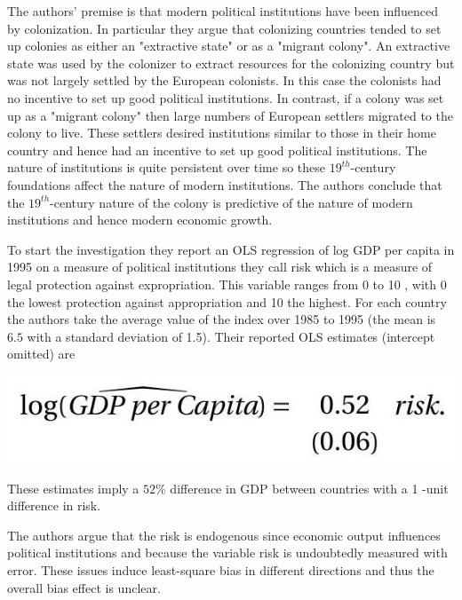 \documentclass[10pt]{article}
\begin{document}
The authors' premise is that modern political institutions have been influenced by colonization. In particular they argue that colonizing countries tended to set up colonies as either an "extractive state" or as a "migrant colony". An extractive state was used by the colonizer to extract resources for the colonizing country but was not largely settled by the European colonists. In this case the colonists had no incentive to set up good political institutions. In contrast, if a colony was set up as a "migrant colony" then large numbers of European settlers migrated to the colony to live. These settlers desired institutions similar to those in their home country and hence had an incentive to set up good political institutions. The nature of institutions is quite persistent over time so these $19^{t h}$-century foundations affect the nature of modern institutions. The authors conclude that the $19^{t h}$-century nature of the colony is predictive of the nature of modern institutions and hence modern economic growth.

To start the investigation they report an OLS regression of log GDP per capita in 1995 on a measure of political institutions they call risk which is a measure of legal protection against expropriation. This variable ranges from 0 to 10 , with 0 the lowest protection against appropriation and 10 the highest. For each country the authors take the average value of the index over 1985 to 1995 (the mean is $6.5$ with a standard deviation of 1.5). Their reported OLS estimates (intercept omitted) are

\includegraphics[max width=\textwidth]{2022_09_17_f9391324ededdbb7a34eg-71}

These estimates imply a $52 \%$ difference in GDP between countries with a 1 -unit difference in risk.

The authors argue that the risk is endogenous since economic output influences political institutions and because the variable risk is undoubtedly measured with error. These issues induce least-square bias in different directions and thus the overall bias effect is unclear.
\end{document}

